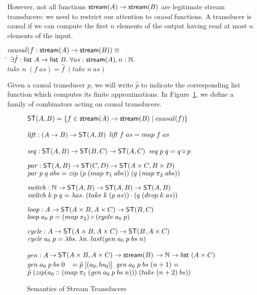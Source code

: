 \documentclass[natbib]{sigplanconf}
\begin{document}
However, not all functions $\mbox{\textsf{{stream}}}({A}) \to \mbox{\textsf{{stream}}}({B})$ are legitimate
stream transducers: we need to restrict our attention to \emph{causal}
functions. A transducer is causal if we can compute the first
$n$ elements of the output having read at most $n$ elements of
the input. 

\begin{tabbing}
$causal(f : \mbox{\textsf{{stream}}}({A}) \to \mbox{\textsf{{stream}}}({B})) \equiv$ \\
\;\;\= $\exists \hat{f} : \mbox{\textsf{{list }}}{A} \to \mbox{\textsf{{list }}}{B}.\;\forall as:\mbox{\textsf{{stream}}}({A}), n:\mathbb{N}.$ \\
    \> \;\;$take\;n\;(f\;as) = \hat{f}\;(take\;n\;as)$ 
\end{tabbing}

Given a causal transducer $p$, we will write $\hat{p}$ to indicate the
corresponding list function which computes its finite
approximations. In Figure~\ref{transducer-semantics}, we define a
family of combinators acting on causal transducers.

\begin{figure}
{\small
\begin{specification}
$\mbox{\textsf{{ST}}}({A}, {B}) = \{{{f \in \mbox{\textsf{{stream}}}({A}) \to \mbox{\textsf{{stream}}}({B})}\;|\;{causal(f)}}\}$

$\mathit{lift} : (A \to B) \to \mbox{\textsf{{ST}}}({A}, {B})$ \nextline
$\mathit{lift} \;f\;as = map\;f\;as$ 

$\mathit{seq}  : \mbox{\textsf{{ST}}}({A}, {B}) \to \mbox{\textsf{{ST}}}({B}, {C}) \to \mbox{\textsf{{ST}}}({A}, {C})$ \nextline
$\mathit{seq} \;p\;q = q \circ p$ 

$\mathit{par}  : \mbox{\textsf{{ST}}}({A}, {B}) \to \mbox{\textsf{{ST}}}({C}, {D}) \to \mbox{\textsf{{ST}}}({A \times C}, {B \times D})$ \nextline
$\mathit{par} \; p\;q\;abs = zip\; (p\;(map\;\pi_1\;abs))\;(q\;(\mathit{map}\;\pi_2\;abs))$

$\mathit{switch} : \mathbb{N} \to \mbox{\textsf{{ST}}}({A}, {B}) \to \mbox{\textsf{{ST}}}({A}, {B}) \to \mbox{\textsf{{ST}}}({A}, {B})$ \nextline
$\mathit{switch}\;k\;p\;q = \lambda as.\;(take\;k\;(p\;as))\cdot(q\;(drop\;k\;as))$ 

$\mathit{loop} : A \to \mbox{\textsf{{ST}}}({A\times B}, {A \times C}) \to \mbox{\textsf{{ST}}}({B}, {C})$ \nextline
$\mathit{loop}\;a_0\;p = (map\;\pi_2) \circ (cycle\;a_0\;p)$ 

$\mathit{cycle} : A \to \mbox{\textsf{{ST}}}({A\times B}, {A \times C}) \to \mbox{\textsf{{ST}}}({B}, {A \times C})$ \nextline
$\mathit{cycle}\;a_0\;p = \lambda bs.\;\lambda n.\;last(gen\;a_0\;p\;bs\;n)$ 

$\mathit{gen} : A $\=$\to \mbox{\textsf{{ST}}}({A\times B}, {A \times C}) \to \mbox{\textsf{{stream}}}({B})$ \nextline
                \>$\to \mathbb{N} \to \mbox{\textsf{{list }}}{(A \times C)}$\nextline
$\mathit{gen}\;a_0\;p\;bs\;0 \;\;\; = \hat{p}\; [(a_0, bs_0)]$ \nextline
$\mathit{gen}\;a_0\;p\;bs\;(n+1) = $ \nextline
\;\;$\hat{p}\;(zip (a_0 :: (map\;\pi_1\;(\mathit{gen}\;a_0\;p\;bs\;n)))\;
                                        (take\;(n+2)\;bs))$ 
\end{specification}
}
\caption{Semantics of Stream Transducers}
\label{transducer-semantics}
\end{figure}
\end{document}
